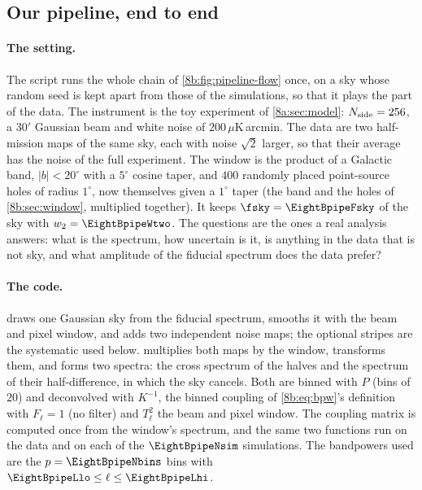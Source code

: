 \subsection{Our pipeline, end to end}
\label{8b:sec:research-run}

\paragraph{The setting.}
The script  runs the whole chain of \cref{8b:fig:pipeline-flow} once, on a sky
whose random seed is kept apart from those of the simulations, so that it plays the part of the data.
The instrument is the toy experiment of \cref{8a:sec:model}: $N_{\rm side}=256$, a $30'$ Gaussian beam and white
noise of $200\,\mu$K\,arcmin. The data are two half-mission maps of the same sky, each with noise $\sqrt2$
larger, so that their average has the noise of the full experiment. The window is the product of a
Galactic band, $|b|<20^\circ$ with a $5^\circ$ cosine taper, and $400$ randomly placed point-source holes of radius
$1^\circ$, now themselves given a $1^\circ$ taper (the band and the holes of \cref{8b:sec:window}, multiplied together). It keeps $\fsky=\EightBpipeFsky$ of the sky with
$w_2=\EightBpipeWtwo$. The questions are the ones a real analysis answers: what is the spectrum, how
uncertain is it, is anything in the data that is not sky, and what amplitude of the fiducial spectrum
does the data prefer?


\paragraph{The code.}
 draws one Gaussian sky from the fiducial spectrum, smooths it with the beam and pixel
window, and adds two independent noise maps; the optional stripes are the systematic used below.
 multiplies both maps by the window, transforms them, and forms two spectra: the cross
spectrum of the halves and the spectrum of their half-difference, in which the sky cancels. Both are
binned with $P$ (bins of $20$) and deconvolved with $K^{-1}$, the binned coupling of
\eqref{8b:eq:bpw}'s definition with $F_\ell=1$ (no filter) and $T_\ell^2$ the beam and pixel window. The
coupling matrix is computed once from the window's spectrum, and the same two functions run on the data
and on each of the $\EightBpipeNsim$ simulations. The bandpowers used are the $p=\EightBpipeNbins$ bins with
$\EightBpipeLlo\le\ell\le\EightBpipeLhi$.

